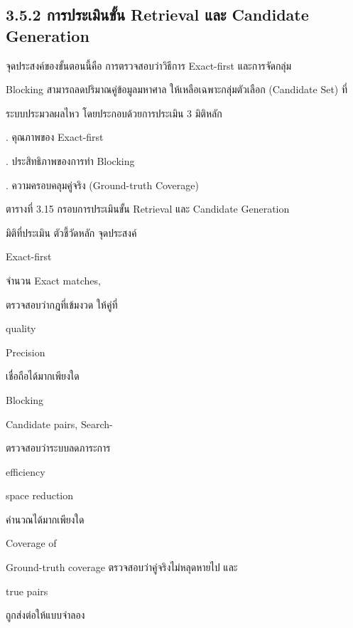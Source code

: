 \documentclass[12pt,a4paper]{report}
\begin{document}
\subsection*{3.5.2 การประเมินขั้น Retrieval และ Candidate Generation}
จุดประสงค์ของขั้นตอนนี้คือ การตรวจสอบว่าวิธีการ Exact-first และการจัดกลุ่ม\par
Blocking สามารถลดปริมาณคู่ข้อมูลมหาศาล ให้เหลือเฉพาะกลุ่มตัวเลือก (Candidate Set) ที่\par
ระบบประมวลผลไหว โดยประกอบด้วยการประเมิน 3 มิติหลัก\par
{}. คุณภาพของ Exact-first\par
{}. ประสิทธิภาพของการทำ Blocking\par
\clearpage
{}. ความครอบคลุมคู่จริง (Ground-truth Coverage)\par
\begin{center}\small ตารางที่ 3.15 กรอบการประเมินขั้น Retrieval และ Candidate Generation\end{center}
มิติที่ประเมิน ตัวชี้วัดหลัก จุดประสงค์\par
Exact-first\par
จำนวน Exact matches,\par
ตรวจสอบว่ากฎที่เข้มงวด ให้คู่ที่\par
quality\par
Precision\par
เชื่อถือได้มากเพียงใด\par
Blocking\par
Candidate pairs, Search-\par
ตรวจสอบว่าระบบลดภาระการ\par
efficiency\par
space reduction\par
คำนวณได้มากเพียงใด\par
Coverage of\par
Ground-truth coverage ตรวจสอบว่าคู่จริงไม่หลุดหายไป และ\par
true pairs\par
ถูกส่งต่อให้แบบจำลอง\par
\end{document}
